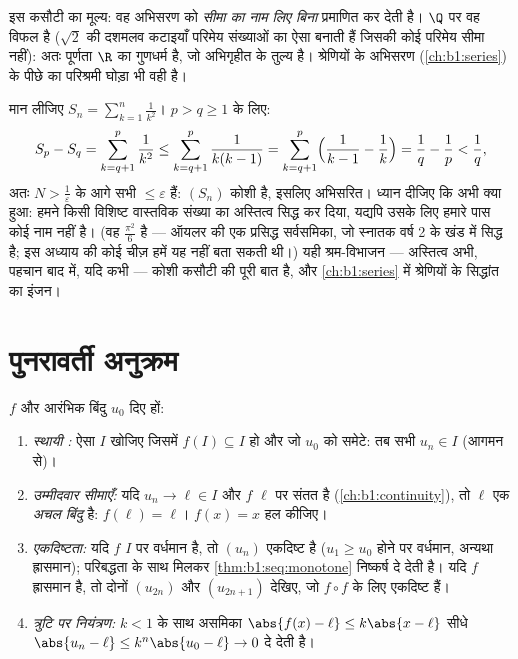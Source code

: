 \begin{remark}
इस कसौटी का मूल्य: वह अभिसरण को \emph{सीमा का नाम लिए बिना} प्रमाणित कर देती
है। $\Q$ पर वह विफल है ($\sqrt 2$ की दशमलव कटाइयाँ परिमेय संख्याओं का ऐसा
 बनाती हैं जिसकी कोई परिमेय सीमा नहीं): अतः पूर्णता $\R$ का
गुणधर्म है, जो  अभिगृहीत के तुल्य है। श्रेणियों के अभिसरण
(\cref{ch:b1:series}) के पीछे का परिश्रमी घोड़ा भी वही है।
\end{remark}

\begin{example}[अदृश्य सीमा वाला एक कोशी अनुक्रम]\label{ex:b1:seq:basel}
मान लीजिए $S_n = \sum_{k=1}^{n} \frac{1}{k^2}$। $p > q \geq 1$ के लिए:
\[
S_p - S_q = \sum_{k=q+1}^{p} \frac{1}{k^2}
\leq \sum_{k=q+1}^{p} \frac{1}{k(k-1)}
= \sum_{k=q+1}^{p} \Bigl(\frac{1}{k-1} - \frac 1k\Bigr)
= \frac 1q - \frac 1p < \frac 1q ,
\]
अतः $N > \frac1\varepsilon$ के आगे सभी  $\leq \varepsilon$ हैं:
$(S_n)$ कोशी है, इसलिए अभिसरित। ध्यान दीजिए कि अभी क्या हुआ: हमने किसी
विशिष्ट वास्तविक संख्या का अस्तित्व सिद्ध कर दिया, यद्यपि उसके लिए हमारे पास
कोई नाम नहीं है। (वह $\frac{\pi^2}{6}$ है --- ऑयलर की एक प्रसिद्ध सर्वसमिका,
जो स्नातक वर्ष 2 के खंड में सिद्ध है; इस अध्याय की कोई चीज़ हमें यह नहीं बता
सकती थी।) यही श्रम-विभाजन --- अस्तित्व अभी, पहचान बाद में, यदि कभी --- कोशी
कसौटी की पूरी बात है, और \cref{ch:b1:series} में श्रेणियों के सिद्धांत का
इंजन।
\end{example}

\section{पुनरावर्ती अनुक्रम}

\begin{method}[$u_{n+1} = f(u_n)$ का अध्ययन]\label{met:b1:seq:recurrent}
$f$ और आरंभिक बिंदु $u_0$ दिए हों:
\begin{enumerate}
  \item \emph{स्थायी :} ऐसा  $I$ खोजिए जिसमें $f(I) \subseteq I$
  हो और जो $u_0$ को समेटे: तब सभी $u_n \in I$ (आगमन से)।
  \item \emph{उम्मीदवार सीमाएँ:} यदि $u_n \to \ell \in I$ और $f$ $\ell$ पर
  संतत है (\cref{ch:b1:continuity}), तो $\ell$ एक \emph{अचल बिंदु} है:
  $f(\ell) = \ell$। $f(x) = x$ हल कीजिए।
  \item \emph{एकदिष्टता:} यदि $f$ $I$ पर वर्धमान है, तो $(u_n)$ एकदिष्ट है
  ($u_1 \geq u_0$ होने पर वर्धमान, अन्यथा ह्रासमान); परिबद्धता के साथ मिलकर
  \cref{thm:b1:seq:monotone} निष्कर्ष दे देती है। यदि $f$ ह्रासमान है, तो
  दोनों  $(u_{2n})$ और $(u_{2n+1})$ देखिए, जो $f \circ f$ के लिए
  एकदिष्ट हैं।
  \item \emph{त्रुटि पर नियंत्रण:} $k < 1$ के साथ असमिका $\abs{f(x) - \ell}
  \leq k\abs{x - \ell}$ सीधे $\abs{u_n - \ell} \leq k^n \abs{u_0 - \ell} \to
  0$ दे देती है।
\end{enumerate}
\end{method}

